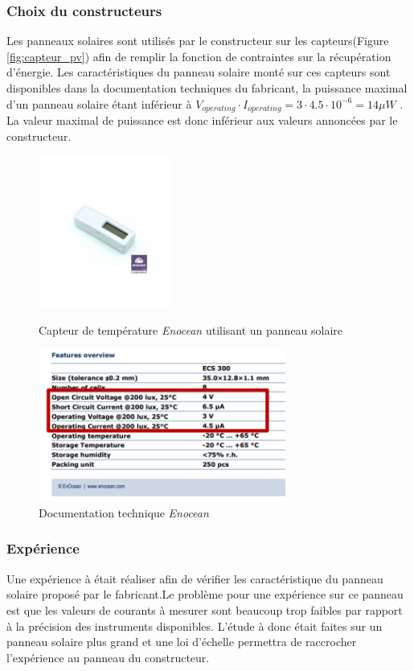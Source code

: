 \documentclass{rapportENS}
\begin{document}
 \subsubsection{Choix du constructeurs}
 Les panneaux solaires sont utilisés par le constructeur sur les capteurs(Figure \ref{fig:capteur_pv}) afin de remplir la fonction de contraintes sur la récupération d'énergie. Les caractéristiques du panneau solaire monté sur ces capteurs sont disponibles dans la documentation techniques du fabricant, la puissance maximal d'un panneau solaire étant inférieur à $V_{operating} \cdot I_{operating} =3\cdot 4.5\cdot 10^{-6} = 14\mu W$ . La valeur maximal de puissance est donc inférieur aux valeurs annoncées par le constructeur.
 
 \begin{figure}[h!]
     \centering
      \begin{minipage}[c]{0.5\linewidth}
     \includegraphics[width=0.7\linewidth,height=5cm] {capteur_pv.jpg}
     \caption{Capteur de température \textit{Enocean} utilisant un panneau solaire}
     \label{fig:capteur_pv}
     \end{minipage}\hfill
      \begin{minipage}[c]{0.5\linewidth}
     \includegraphics[width=0.9\linewidth,height=5cm]{doc_pv.png}
     \caption{Documentation technique  \textit{Enocean}}
     \label{fig:doc_pv}
     \end{minipage}\hfill
 \end{figure}
 
 \subsubsection{Expérience}
 Une expérience à était réaliser afin de vérifier les caractéristique du panneau solaire proposé par le fabricant.Le problème pour une expérience sur ce panneau est que les valeurs de courants à mesurer sont beaucoup trop faibles par rapport à la précision des instruments disponibles. L'étude à donc était faites sur un panneau solaire plus grand et une loi d'échelle permettra de raccrocher l'expérience au panneau du constructeur.
\end{document}

